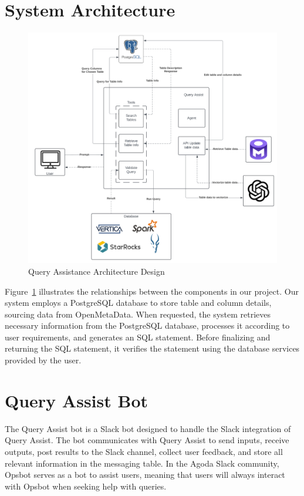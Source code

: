 \section{System Architecture}
\begin{figure}[H]
    \centering
    \includegraphics[width=15cm]{chapters/3/figures/architecture.png}
    \caption[Query Assistance Architecture Design]{Query Assistance Architecture Design}
    \label{fig:query_assist_architecture_design}
\end{figure}
Figure~\ref{fig:query_assist_architecture_design} illustrates the relationships between the components in our project. Our system employs a PostgreSQL database to store table and column details, sourcing data from OpenMetaData. When requested, the system retrieves necessary information from the PostgreSQL database, processes it according to user requirements, and generates an SQL statement. Before finalizing and returning the SQL statement, it verifies the statement using the database services provided by the user.

\section{Query Assist Bot}
The Query Assist bot is a Slack bot designed to handle the Slack integration of Query Assist. The bot communicates with Query Assist to send inputs, receive outputs, post results to the Slack channel, collect user feedback, and store all relevant information in the messaging table. In the Agoda Slack community, Opsbot serves as a bot to assist users, meaning that users will always interact with Opsbot when seeking help with queries.

